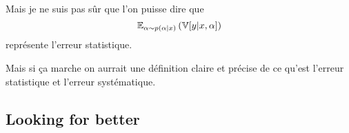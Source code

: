 Mais je ne suis pas sûr que l'on puisse dire que
$$\mathbb{E}_{\alpha \sim p(\alpha|x)} \left (\mathbb{V}[y|x, \alpha] \right )$$
représente l'erreur statistique.

Mais si ça marche on aurrait une définition claire et précise de ce qu'est l'erreur statistique et l'erreur systématique.





\subsection{Looking for better} %
\label{sub:looking_for_better}




